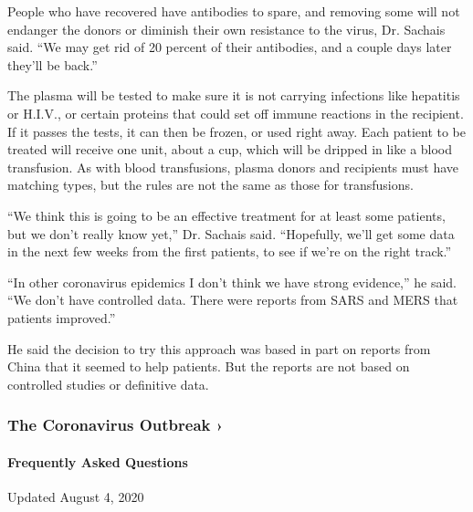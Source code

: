 People who have recovered have antibodies to spare, and removing some
will not endanger the donors or diminish their own resistance to the
virus, Dr. Sachais said. ``We may get rid of 20 percent of their
antibodies, and a couple days later they'll be back.''

The plasma will be tested to make sure it is not carrying infections
like hepatitis or H.I.V., or certain proteins that could set off immune
reactions in the recipient. If it passes the tests, it can then be
frozen, or used right away. Each patient to be treated will receive one
unit, about a cup, which will be dripped in like a blood transfusion. As
with blood transfusions, plasma donors and recipients must have matching
types, but the rules are not the same as those for transfusions.

``We think this is going to be an effective treatment for at least some
patients, but we don't really know yet,'' Dr. Sachais said. ``Hopefully,
we'll get some data in the next few weeks from the first patients, to
see if we're on the right track.''

``In other coronavirus epidemics I don't think we have strong
evidence,'' he said. ``We don't have controlled data. There were reports
from SARS and MERS that patients improved.''

He said the decision to try this approach was based in part on reports
from China that it seemed to help patients. But the reports are not
based on controlled studies or definitive data.

\href{https://www.nytimes.com/news-event/coronavirus?action=click\&pgtype=Article\&state=default\&region=MAIN_CONTENT_3\&context=storylines_faq}{}

\hypertarget{the-coronavirus-outbreak-}{%
\subsubsection{The Coronavirus Outbreak
›}\label{the-coronavirus-outbreak-}}

\hypertarget{frequently-asked-questions}{%
\paragraph{Frequently Asked
Questions}\label{frequently-asked-questions}}

Updated August 4, 2020


